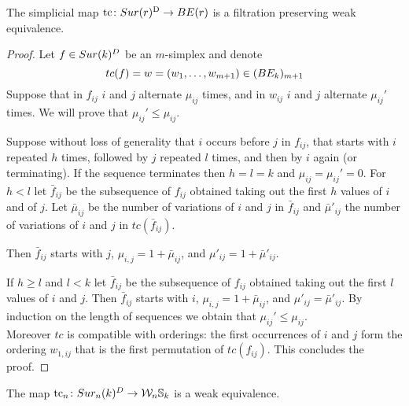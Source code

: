 \begin{theorem}
	The simplicial map $\operatorname{tc} \colon Sur(r)^{\mathrm{D}} \to BE(r)$ is a filtration preserving weak equivalence.
\end{theorem}


\begin{proof}
	Let $f\in Sur(k)^{D}$ be an $m$-simplex and denote
	$$tc(f)=w=(w_{1},\dots,w_{m+1})\in (BE_{k})_{m+1}$$
	Suppose that in $f_{ij}$ $i$ and $j$ alternate $\mu_{ij}$ times, and in $w_{ij}$ $i$ and $j$ alternate $\mu_{ij}'$ times.
	We will prove that
	$\mu_{ij}' \leq \mu_{ij}$.

	Suppose without loss of generality that $i$ occurs before $j$ in $f_{ij}$, that starts with $i$ repeated $h$ times, followed by $j$ repeated $l$ times, and
	then by $i$ again (or terminating).
	If the sequence terminates then $h=l=k$ and $\mu_{ij}=\mu_{ij}'=0$.
	For $h <l$
	let $\bar{f}_{ij}$ be the subsequence of $f_{ij}$
	obtained taking out the first $h$ values of $i$ and of $j$.
	Let $\bar{\mu}_{ij}$ be the number of variations of $i$ and $j$ in $\bar{f}_{ij}$
	and $\bar{\mu}'_{ij}$ the number of variations of $i$ and $j$ in $tc(\bar{f}_{ij})$.

	Then $\bar{f}_{ij}$
	starts with $j$,
	$\mu_{i,j}=1+\bar{\mu}_{ij}$,
	and $\mu'_{ij}=1+\bar{\mu}'_{ij}$.

	If $h \geq l$ and $l<k$
	let $\bar{f}_{ij}$ be the subsequence of $f_{ij}$ obtained taking out the first $l$ values of $i$ and $j$.
	Then $\bar{f}_{ij}$
	starts with $i$,
	$\mu_{i,j}=1+\bar{\mu}_{ij}$,
	and $\mu'_{ij}=\bar{\mu}'_{ij}$.
	By induction on the length of sequences we obtain that
	$\mu_{ij}'\le \mu_{ij}$.\\
	Moreover $tc$ is compatible with orderings: the first occurrences of $i$ and $j$ form the ordering $w_{1,ij}$ that is the first permutation of $tc(f_{ij})$.
	This concludes the proof.
\end{proof}

\begin{corollary}\label{cor-comparing}
	The map $\operatorname{tc}_{n} \colon Sur_{n}(k)^{D}\rightarrow \mathcal{W}_{n}\mathbb{S}_{k}$ is a weak equivalence.
\end{corollary}

